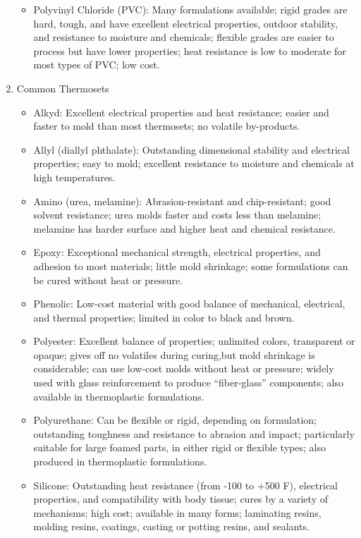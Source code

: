 \documentclass[a4paper,openany,nobib]{tufte-book}
\begin{document}
\begin{enumerate}
\begin{itemize}
\item Polyvinyl Chloride (PVC): Many formulations available; rigid grades
are hard, tough, and have excellent electrical properties, outdoor
stability, and resistance to moisture and chemicals; flexible grades
are easier to process but have lower properties; heat resistance is
low to moderate for most types of PVC; low cost.
\end{itemize}

\item Common Thermosets
\label{common-thermosets}
\begin{itemize}
\item Alkyd: Excellent electrical properties and heat resistance; easier and
faster to mold than most thermosets; no volatile by-products.

\item Allyl (diallyl phthalate): Outstanding dimensional stability and
electrical properties; easy to mold; excellent resistance to moisture
and chemicals at high temperatures.

\item Amino (urea, melamine): Abrasion-resistant and chip-resistant; good
solvent resistance; urea molds faster and costs less than melamine;
melamine has harder surface and higher heat and chemical resistance.

\item Epoxy: Exceptional mechanical strength, electrical properties, and
adhesion to most materials; little mold shrinkage; some formulations
can be cured without heat or pressure.

\item Phenolic: Low-cost material with good balance of mechanical,
electrical, and thermal properties; limited in color to black and
brown.

\item Polyester: Excellent balance of properties; unlimited colors,
transparent or opaque; gives off no volatiles during curing,but mold
shrinkage is considerable; can use low-cost molds without heat or
pressure; widely used with glass reinforcement to produce
``fiber-glass'' components; also available in thermoplastic
formulations.

\item Polyurethane: Can be flexible or rigid, depending on formulation;
outstanding toughness and resistance to abrasion and impact;
particularly suitable for large foamed parts, in either rigid or
flexible types; also produced in thermoplastic formulations.

\item Silicone: Outstanding heat resistance (from -100 to +500 F),
electrical properties, and compatibility with body tissue; cures by a
variety of mechanisms; high cost; available in many forms; laminating
resins, molding resins, coatings, casting or potting resins, and
sealants.
\end{itemize}
\end{enumerate}
\end{document}
